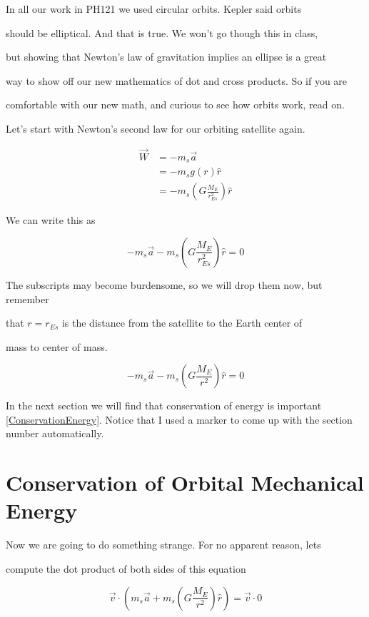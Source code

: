 In all our work in PH121 we used circular orbits. Kepler said orbits

should be elliptical. And that is true. We won't go though this in class,

but showing that Newton's law of gravitation implies an ellipse is a great

way to show off our new mathematics of dot and cross products. So if you are

comfortable with our new math, and curious to see how orbits work, read on.


Let's start with Newton's second law for our orbiting satellite again.

\begin{align*}
\overrightarrow{W}&=-m_{s}\overrightarrow{a}\\
&=-m_{s}g\left( r\right) \hat{r}\\
&=-m_{s}\left( G\frac{M_{E}}{r_{Es}^{2}}\right) \hat{r}
\end{align*}




We can write this as 

$$
-m_{s}\overrightarrow{a}-m_{s}\left( G\frac{M_{E}}{r_{Es}^{2}}\right) \hat{r}=0
$$


The subscripts may become burdensome, so we will drop them now, but remember

that $r=r_{Es}$ is the distance from the satellite to the Earth center of

mass to center of mass. 

$$-m_{s}\overrightarrow{a}-m_{s}\left( G\frac{M_{E}}{r^{2}}\right) \hat{r}=0$$

In the next section we will find that conservation of energy is important \ref{ConservationEnergy}. Notice that I used a marker to come up with the section number automatically.

\section{Conservation of Orbital Mechanical Energy\label{ConservationEnergy}}


Now we are going to do something strange. For no apparent reason, lets

compute the dot product of both sides of this equation 

$$\overrightarrow{v}\cdot \left( m_{s}\overrightarrow{a}+m_{s}\left( G\frac{M_{E}}{r^{2}}\right) \hat{r}\right) =\overrightarrow{v}\cdot 0 $$

